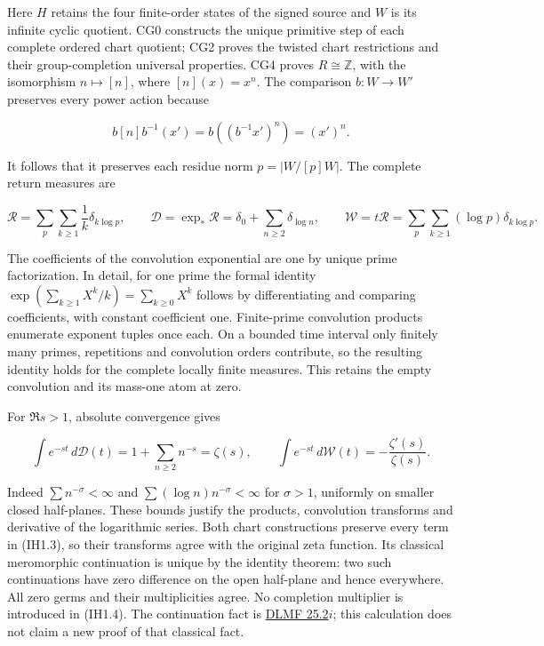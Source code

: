 Here \(H\) retains the four finite-order states of the signed source and
\(W\) is its infinite cyclic quotient. CG0 constructs the unique
primitive step of each complete ordered chart quotient; CG2 proves the
twisted chart restrictions and their group-completion universal
properties. CG4 proves \(R\cong\mathbb Z\), with the isomorphism
\(n\mapsto[n]\), where \([n](x)=x^n\). The comparison \(b:W\to W'\)
preserves every power action because

\[
b[n]b^{-1}(x')=b((b^{-1}x')^n)=(x')^n.
\tag{IH1.2}
\]

It follows that it preserves each residue norm \(p=|W/[p]W|\). The
complete return measures are

\[
\mathcal R=\sum_p\sum_{k\ge1}\frac1k\delta_{k\log p},\qquad
\mathcal D=\exp_*\mathcal R=\delta_0+\sum_{n\ge2}\delta_{\log n},
\qquad
\mathcal W=t\mathcal R=\sum_p\sum_{k\ge1}(\log p)\delta_{k\log p}.
\tag{IH1.3}
\]

The coefficients of the convolution exponential are one by unique prime
factorization. In detail, for one prime the formal identity
\(\exp(\sum_{k\ge1}X^k/k)=\sum_{k\ge0}X^k\) follows by differentiating
and comparing coefficients, with constant coefficient one. Finite-prime
convolution products enumerate exponent tuples once each. On a bounded
time interval only finitely many primes, repetitions and convolution
orders contribute, so the resulting identity holds for the complete
locally finite measures. This retains the empty convolution and its
mass-one atom at zero.

For \(\Re s>1\), absolute convergence gives

\[
\int e^{-st}\,d\mathcal D(t)=1+\sum_{n\ge2}n^{-s}=\zeta(s),
\qquad
\int e^{-st}\,d\mathcal W(t)=-\frac{\zeta'(s)}{\zeta(s)}.
\tag{IH1.4}
\]

Indeed \(\sum n^{-\sigma}<\infty\) and
\(\sum (\log n)n^{-\sigma}<\infty\) for \(\sigma>1\), uniformly on
smaller closed half-planes. These bounds justify the products,
convolution transforms and derivative of the logarithmic series. Both
chart constructions preserve every term in (IH1.3), so their transforms
agree with the original zeta function. Its classical meromorphic
continuation is unique by the identity theorem: two such continuations
have zero difference on the open half-plane and hence everywhere. All
zero germs and their multiplicities agree. No completion multiplier is
introduced in (IH1.4). The continuation fact is
\href{https://dlmf.nist.gov/25.2\#i}{DLMF 25.2\(i\)}; this calculation
does not claim a new proof of that classical fact.

